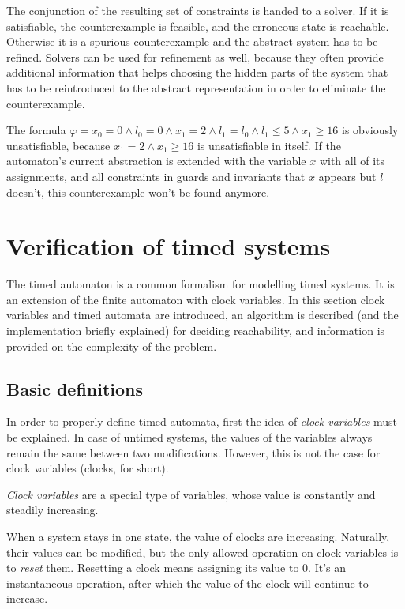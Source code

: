 The conjunction of the resulting set of constraints is handed to a solver. If it is satisfiable, the counterexample is feasible, and the erroneous state is reachable. Otherwise it is a spurious counterexample and the abstract system has to be refined. Solvers can be used for refinement as well, because they often provide additional information that helps choosing the hidden parts of the system that has to be reintroduced to the abstract representation in order to eliminate the counterexample.

\begin{example}
	The formula $\varphi = x_0=0 \wedge l_0=0 \wedge x_1=2 \wedge l_1=l_0 \wedge l_1 \leq 5 \wedge x_1 \geq 16$ is obviously unsatisfiable, because $x_1=2 \wedge x_1 \geq 16$ is unsatisfiable in itself. If the automaton's current abstraction is extended with the variable $x$ with all of its assignments, and all constraints in guards and invariants that $x$ appears but $l$ doesn't, this counterexample won't be found anymore.
\end{example}


\section{Verification of timed systems}

The timed automaton is a common formalism for modelling timed systems. It is an extension of the finite automaton with clock variables. In this section clock variables and timed automata are introduced, an algorithm is described (and the implementation briefly explained) for deciding reachability, and information is provided on the complexity of the problem.

\subsection{Basic definitions}


In order to properly define timed automata, first the idea of \emph{clock variables} must be explained. In case of untimed systems, the values of the variables always remain the same between two modifications. However, this is not the case for clock variables (clocks, for short).

\begin{dfn}
	\emph{Clock variables} are a special type of variables, whose value is constantly and steadily increasing.
\end{dfn}

When a system stays in one state, the value of clocks are increasing. Naturally, their values can be modified, but the only allowed operation on clock variables is to \emph{reset} them. Resetting a clock means assigning its value to 0. It's an instantaneous operation, after which the value of the clock will continue to increase.

